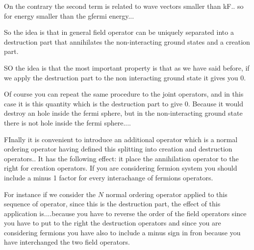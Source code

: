 \documentclass[../main/main.tex]{subfiles}
\begin{document}
On the contrary the second term is related to wave vectors smaller than kF.. so for energy smaller than the gfermi energy...

So the idea is that in general field operator can be uniquely separated into a destruction part that annihilates the non-interacting ground states and a creation part.

SO the idea is that the most important property is that as we have said before, if we apply the destruction part to the non interacting ground state it gives you 0.

Of course you can repeat the same procedure to the joint operators, and in this case it is this quantity which is the destruction part to give 0. Because it would destroy an hole inside the fermi sphere, but in the non-interacting ground state there is not hole inside the fermi sphere....


FInally it is convenient to introduce an additional operator which is a normal ordering operator having defined this splitting into creation and destruction operators.. It has the following effect: it place the annihilation operator to the right for creation operators. If you are considering fermion system you should include a minus 1 factor for every interachange of fermions operators.

For instance if we consider the \( N \) normal ordering operator applied to this sequence of operator, since this is the destruction part, the effect of this application is....because you have to reverse the order of the field operators since you have to put to the right the destruction operators and since you are considering fermions you have also to include a minus sign in fron because you have interchanged the two field operators.
\end{document}
